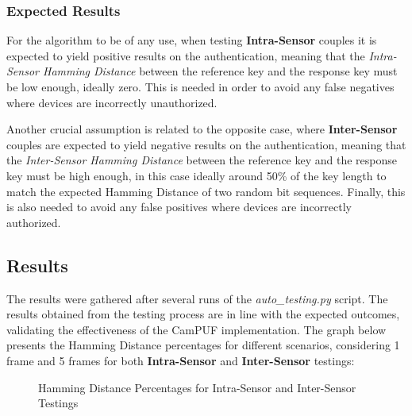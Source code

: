 \subsubsection{Expected Results}

For the algorithm to be of any use, when testing \textbf{Intra-Sensor} couples it is expected to yield positive results on the authentication, meaning that the \emph{Intra-Sensor Hamming Distance} between the reference key and the response key must be low enough, ideally zero. This is needed in order to avoid any false negatives where devices are incorrectly unauthorized.

Another crucial assumption is related to the opposite case, where \textbf{Inter-Sensor} couples are expected to yield negative results on the authentication, meaning that the \emph{Inter-Sensor Hamming Distance} between the reference key and the response key must be high enough, in this case ideally around 50\% of the key length to match the expected Hamming Distance of two random bit sequences. Finally, this is also needed to avoid any false positives where devices are incorrectly authorized.

\subsection{Results}
The results were gathered after several runs of the \emph{auto\_testing.py} script. The results obtained from the testing process are in line with the expected outcomes, validating the effectiveness of the CamPUF implementation. The graph below presents the Hamming Distance percentages for different scenarios, considering 1 frame and 5 frames for both \textbf{Intra-Sensor} and \textbf{Inter-Sensor} testings:

\begin{figure}[h!]
	\centering
	\caption{Hamming Distance Percentages for Intra-Sensor and Inter-Sensor Testings}
	\label{fig:results_graph}
\end{figure}

